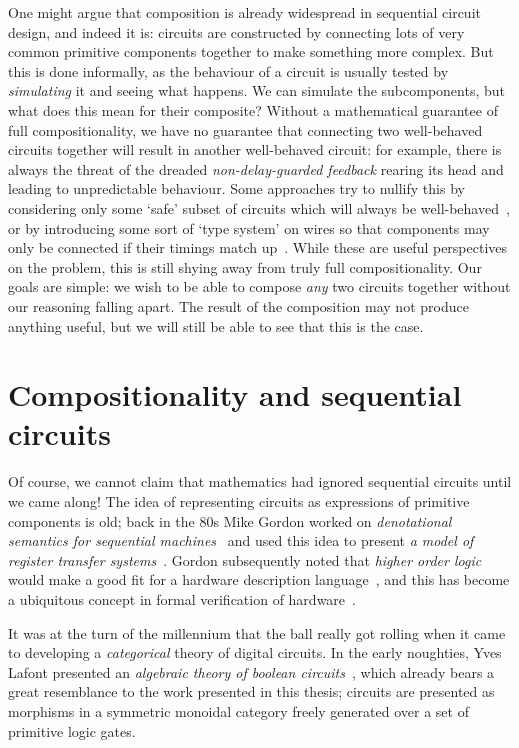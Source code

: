 One might argue that composition is already widespread in sequential circuit
design, and indeed it is: circuits are constructed by connecting lots of very
common primitive components together to make something more complex.
But this is done informally, as the behaviour of a circuit is usually tested
by \emph{simulating} it and seeing what happens.
We can simulate the subcomponents, but what does this mean for their composite?
Without a mathematical guarantee of full compositionality, we have no guarantee
that connecting two well-behaved circuits together will result in another
well-behaved circuit: for example, there is always the threat of the dreaded
\emph{non-delay-guarded feedback} rearing its head and leading to unpredictable
behaviour.
Some approaches try to nullify this by considering only some `safe' subset of
circuits which will always be well-behaved~\cite{christensen2021wire}, or by
introducing some sort of `type system' on wires so that components may only be
connected if their timings match up~\cite{nigam2023modular}.
While these are useful perspectives on the problem, this is still shying away
from truly full compositionality.
Our goals are simple: we wish to be able to compose \emph{any} two circuits
together without our reasoning falling apart.
The result of the composition may not produce anything useful, but we will still
be able to see that this is the case.

\section{Compositionality and sequential circuits}

Of course, we cannot claim that mathematics had ignored sequential circuits
until we came along!
The idea of representing circuits as expressions of primitive components is old;
back in the 80s Mike Gordon worked on
\emph{denotational semantics for sequential machines}~\cite{gordon1980denotational}
and used this idea to present
\emph{a model of register transfer systems}~\cite{gordon1982model}.
Gordon subsequently noted that \emph{higher order logic} would make a good fit
for a hardware description language~\cite{gordon1985why}, and this has become
a ubiquitous concept in formal verification of hardware~\cite{gupta1992formal}.

It was at the turn of the millennium that the ball really got rolling when it
came to developing a \emph{categorical} theory of digital circuits.
In the early noughties, Yves Lafont presented an
\emph{algebraic theory of boolean circuits}~\cite{lafont2003algebraic}, which
already bears a great resemblance to the work presented in this thesis; circuits
are presented as morphisms in a symmetric monoidal category freely generated
over a set of primitive logic gates.

